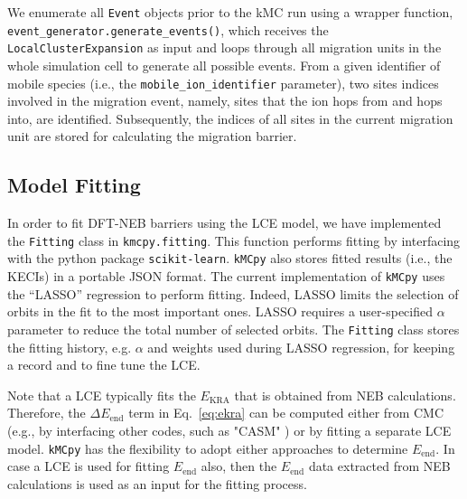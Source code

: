 \documentclass[a4paper,fleqn]{cas-dc}
\begin{document}
{We enumerate all \texttt{Event} objects prior to the kMC run using a wrapper function,  \texttt{event\_generator.generate\_events()}, which receives the \texttt{LocalClusterExpansion} as input and loops through all migration units in the whole simulation cell to generate all possible events. From a given identifier of mobile species (i.e., the \texttt{mobile\_ion\_identifier} parameter), two sites indices involved in the migration event, namely, sites that the ion hops from and hops into, are identified. Subsequently, the indices of all sites in the current migration unit are stored for calculating the migration barrier.


\subsection{Model Fitting}\label{sec:fitting}
\noindent In order to fit DFT-NEB barriers using the LCE model, we have implemented the \texttt{Fitting} class in \texttt{kmcpy.fitting}. This function performs fitting by interfacing with the python package \texttt{scikit-learn}\cite{scikit-learn}. \texttt{kMCpy} also stores fitted results (i.e., the KECIs) in a portable JSON format. The current implementation of \texttt{kMCpy} uses the ``LASSO'' regression\cite{santosa_linear_1986}  to perform  fitting. Indeed, LASSO  limits the selection of orbits in the fit to the most important ones. LASSO requires a user-specified $\alpha$ parameter to reduce the total number of selected orbits. The \texttt{Fitting} class stores the fitting history, e.g. $\alpha$ and weights used during LASSO regression, for keeping a record and to fine tune the LCE. 

 Note that a LCE typically fits the $E_\mathrm{KRA}$ that is obtained from NEB calculations.  Therefore, the $\Delta E_\mathrm{end}$ term in Eq.~{\ref{eq:ekra}} can be computed either from CMC (e.g., by interfacing  other codes, such as "CASM" {\cite{thomas_casm_2022}}) or by fitting a separate LCE model. \texttt{kMCpy} has the flexibility to adopt either approaches to determine $E_\mathrm{end}$. In case a LCE is used for fitting $E_\mathrm{end}$ also, then the $E_\mathrm{end}$ data extracted from NEB calculations is used as an input for the fitting process.  

}
\end{document}
